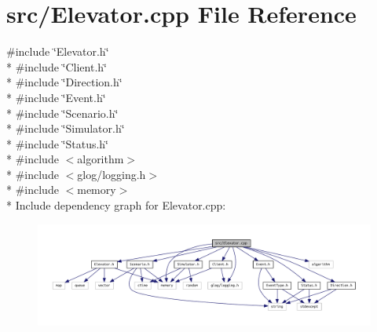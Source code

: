 \section{src/\+Elevator.cpp File Reference}
\label{_elevator_8cpp}
{\ttfamily \#include \char`\"{}Elevator.\+h\char`\"{}}\\*
{\ttfamily \#include \char`\"{}Client.\+h\char`\"{}}\\*
{\ttfamily \#include \char`\"{}Direction.\+h\char`\"{}}\\*
{\ttfamily \#include \char`\"{}Event.\+h\char`\"{}}\\*
{\ttfamily \#include \char`\"{}Scenario.\+h\char`\"{}}\\*
{\ttfamily \#include \char`\"{}Simulator.\+h\char`\"{}}\\*
{\ttfamily \#include \char`\"{}Status.\+h\char`\"{}}\\*
{\ttfamily \#include $<$algorithm$>$}\\*
{\ttfamily \#include $<$glog/logging.\+h$>$}\\*
{\ttfamily \#include $<$memory$>$}\\*
Include dependency graph for Elevator.\+cpp\+:\nopagebreak
\begin{figure}[H]
\begin{center}
\leavevmode
\includegraphics[width=350pt]{_elevator_8cpp__incl}
\end{center}
\end{figure}
